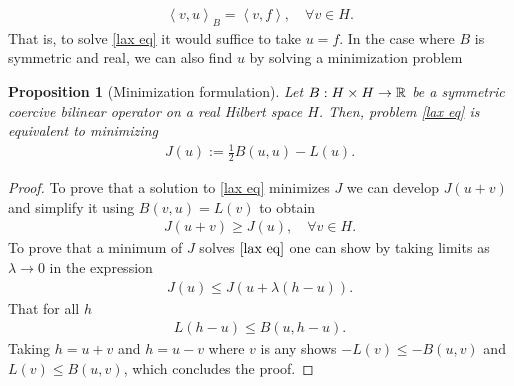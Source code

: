 \documentclass[12pt]{article}
\newtheorem{proposition}{Proposition}
\newcommand{\br}[1]{\left\langle#1\right\rangle} \newcommand{\set}[1]{\left\{#1\right\}}\newcommand{\qt}[1]{\left(#1\right)} \newcommand{\qp}[1]{\left(#1\right)}\newcommand{\qb}[1]{\left[#1\right]}
\begin{document}
\begin{CJK*}{UTF8}{gbsn}
	\begin{align*}
		\br{v,u}_B= \br{v,f} , \quad\forall v\in H.
	\end{align*}
	That is, to solve \eqref{lax eq} it would suffice to take $u=f$. In the case where $B$ is symmetric and real, we can also find $u$ by solving a minimization problem
	\begin{proposition}[Minimization formulation]
		Let $B: H\times H \to \mathbb{R}$ be a symmetric coercive bilinear operator on a real Hilbert space $H$. Then, problem  \eqref{lax eq} is equivalent to minimizing
		\begin{align*}
			J(u):= \frac{1}{2}B(u,u)-L(u) .
		\end{align*}
	\end{proposition}
	\begin{proof}
		To prove that a solution to \eqref{lax eq} minimizes $J$ we can develop  $J(u+v)$ and simplify it using  $B(v,u)=L(v)$ to obtain
		\begin{align*}
			J(u+v) \geq J(u) , \quad\forall  v \in H.
		\end{align*}
		To prove that a  minimum of $J$ solves  $\eqref{lax eq}$ one can show by taking limits as $\lambda  \to 0$ in the expression
		\begin{align*}
			J(u) \leq J(u+ \lambda (h-u)).
		\end{align*}
		That  for all $h $
		\begin{align*}
			L(h-u) \leq B(u,h-u).
		\end{align*}
		Taking $h=u+v$ and $h=u-v$ where $v$ is any shows  $-L(v) \leq -B(u,v)$ and $L(v) \leq B(u,v)$, which concludes the proof.
	\end{proof}

\end{CJK*}
\end{document}
